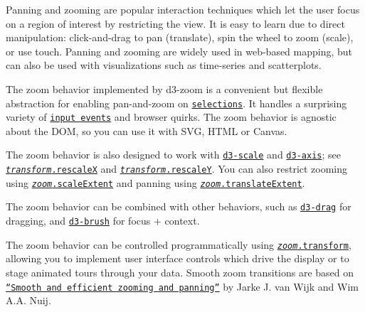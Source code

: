 Panning and zooming are popular interaction techniques which let the user focus on a region of interest by restricting the view. It is easy to learn due to direct manipulation\+: click-\/and-\/drag to pan (translate), spin the wheel to zoom (scale), or use touch. Panning and zooming are widely used in web-\/based mapping, but can also be used with visualizations such as time-\/series and scatterplots.

The zoom behavior implemented by d3-\/zoom is a convenient but flexible abstraction for enabling pan-\/and-\/zoom on \href{https://github.com/d3/d3-selection}{\tt selections}. It handles a surprising variety of \href{#api-reference}{\tt input events} and browser quirks. The zoom behavior is agnostic about the D\+OM, so you can use it with S\+VG, H\+T\+ML or Canvas.

\href{https://bl.ocks.org/mbostock/d1f7b58631e71fbf9c568345ee04a60e}{\tt }\href{https://bl.ocks.org/mbostock/4e3925cdc804db257a86fdef3a032a45}{\tt }

The zoom behavior is also designed to work with \href{https://github.com/d3/d3-scale}{\tt d3-\/scale} and \href{https://github.com/d3/d3-axis}{\tt d3-\/axis}; see \href{#transform_rescaleX}{\tt {\itshape transform}.rescaleX} and \href{#transform_rescaleY}{\tt {\itshape transform}.rescaleY}. You can also restrict zooming using \href{#zoom_scaleExtent}{\tt {\itshape zoom}.scale\+Extent} and panning using \href{#zoom_translateExtent}{\tt {\itshape zoom}.translate\+Extent}.

\href{https://bl.ocks.org/mbostock/db6b4335bf1662b413e7968910104f0f}{\tt }

The zoom behavior can be combined with other behaviors, such as \href{https://github.com/d3/d3-drag}{\tt d3-\/drag} for dragging, and \href{https://github.com/d3/d3-brush}{\tt d3-\/brush} for focus + context.

\href{https://bl.ocks.org/mbostock/3127661b6f13f9316be745e77fdfb084}{\tt }\href{https://bl.ocks.org/mbostock/34f08d5e11952a80609169b7917d4172}{\tt }

The zoom behavior can be controlled programmatically using \href{#zoom_transform}{\tt {\itshape zoom}.transform}, allowing you to implement user interface controls which drive the display or to stage animated tours through your data. Smooth zoom transitions are based on \href{http://www.win.tue.nl/~vanwijk/zoompan.pdf}{\tt “\+Smooth and efficient zooming and panning”} by Jarke J. van Wijk and Wim A.\+A. Nuij.

\href{https://bl.ocks.org/mbostock/b783fbb2e673561d214e09c7fb5cedee}{\tt }

